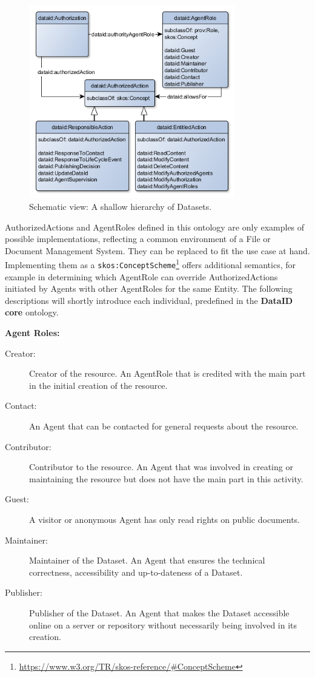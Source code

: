 \documentclass[a4paper,english,twoside,BCOR1.5cm,headsepline,DIV12,appendixprefix,final,12pt]{scrbook}
\newcommand{\core}{{\ttfamily\bfseries DataID core}\xspace}
\newcommand{\prop}[1]{{{\texttt{#1}}}}
\newcommand\footnoteurl[1]{\footnote{\scriptsize\url{#1}}}
\begin{document}
\begin{figure}[!htbp]
\centering
  \includegraphics[width=9cm]{images/ClassAuthorizedAction.png}
  \caption{Schematic view: A shallow hierarchy of Datasets.}
  \label{fig:example}
\end{figure}

AuthorizedActions and AgentRoles defined in this ontology are only examples of possible implementations, reflecting a common environment of a File or Document Management System. They can be replaced to fit the use case at hand. Implementing them as a \prop{skos:ConceptScheme}\footnoteurl{https://www.w3.org/TR/skos-reference/#ConceptScheme} offers additional semantics, for example in determining which AgentRole can override AuthorizedActions initiated by Agents with other AgentRoles for the same Entity. The following descriptions will shortly introduce each individual, predefined in the \core ontology.

{\large\textbf{Agent Roles:}}
\begin{description}
\item[Creator:] Creator of the resource. An AgentRole that is credited with the main part in the initial creation of the resource.
\item[Contact:] An Agent that can be contacted for general requests about the resource.
\item[Contributor:] Contributor to the resource. An Agent that was involved in creating or maintaining the resource but does not have the main part in this activity.
\item[Guest:] A visitor or anonymous Agent has only read rights on public documents.
\item[Maintainer:] Maintainer of the Dataset. An Agent that ensures the technical correctness, accessibility and up-to-dateness of a Dataset.
\item[Publisher:] Publisher of the Dataset. An Agent that makes the Dataset accessible online on a server or repository without necessarily being involved in its creation.\\
\end{description}
\end{document}
